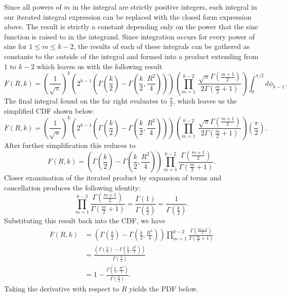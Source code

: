 \documentclass[11pt]{article} %
\begin{document}
Since all powers of $m$ in the integral are strictly positive integers, each integral in our iterated integral expression can be replaced with the closed form expression above.  The result is strictly a constant depending only on the power that the sine function is raised to in the integrand.  Since integration occurs for every power of sine for $1 \le m \le k-2$, the results of each of these integrals can be gathered as constants to the outside of the integral and formed into a product extending from $1$ to $k-2$ which leaves us with the following result
%
$$F(R,k) = \left( \frac{1}{\sqrt{\pi}}\right)^k \left( 2^{k-1}\left( \Gamma\left( \frac{k}{2}\right)-\Gamma\left( \frac{k}{2},\frac{R^2}{4}\right)\right)\right) 
\left( \prod^{k-2}_{m=1}\ \frac{\sqrt{\pi}\Gamma\left(\frac{m+1}{2}\right)}
{2\Gamma\left(\frac{m}{2}+1\right)}\right)
\int^{\pi/2}_0d\phi_{k-1}.$$
%
\indent   The final integral found on the far right evaluates to $\frac{\pi}{2}$, which leaves us the simplified CDF shown below. 
%
$$F(R,k) = \left( \frac{1}{\sqrt{\pi}}\right)^k \left( 2^{k-1}\left( \Gamma\left( \frac{k}{2}\right)-\Gamma\left( \frac{k}{2},\frac{R^2}{4}\right)\right)\right) 
\left( \prod^{k-2}_{m=1}\ \frac{\sqrt{\pi}\Gamma\left(\frac{m+1}{2}\right)}
{2\Gamma\left(\frac{m}{2}+1\right)}\right)
\left( \frac{\pi}{2}\right).$$ 
%
\indent After further simplification this reduces to
%
$$F(R,k)=\left( \Gamma\left( \frac{k}{2}\right)-\Gamma\left( \frac{k}{2},\frac{R^2}{4}\right)\right)
\prod^{k-2}_{m=1}\frac{\Gamma\left( \frac{m+1}{2}\right)}{\Gamma\left(\frac{m}{2}+1\right)}.$$
%
\indent Closer examination of the iterated product by expansion of terms and cancellation produces the following identity:
$$\prod^{k-2}_{m=1}\frac{\Gamma\left( \frac{m+1}{2}\right)}{\Gamma\left(\frac{m}{2}+1\right)} = \frac{\Gamma\left(1\right)}{\Gamma\left(\frac{k}{2}\right)} =
\frac{1}{\Gamma\left(\frac{k}{2}\right)}.$$
%
\indent
Substituting this result back into the CDF, we have
\begin{align*}
F(R,k)&=\left( \Gamma\left( \frac{k}{2}\right)-\Gamma\left( \frac{k}{2},\frac{R^2}{4}\right)\right)
\prod^{k-2}_{m=1}\frac{\Gamma\left( \frac{m+1}{2}\right)}{\Gamma\left(\frac{m}{2}+1\right)} \\ 
&= \frac{\left(\Gamma\left(\frac{k}{2}\right)-\Gamma\left(\frac{k}{2},\frac{R^2}{4}\right)\right)}{\Gamma\left(\frac{k}{2}\right)} \\
&=1-\frac{\Gamma\left(\frac{k}{2},\frac{R^2}{4}\right)}{\Gamma\left(\frac{k}{2}\right)}.
\end{align*}
%
\indent Taking the derivative with respect to $R$ yields the PDF below.
\end{document}
